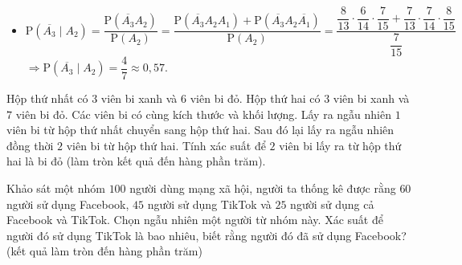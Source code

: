 \begin{bt}
{\begin{itemize}
\begin{eqnarray*}
				 &=&\dfrac{7}{13}\cdot \dfrac{7}{14}\cdot \dfrac{8}{15}.
			\end{eqnarray*}
			\item  $\mathrm{P}\left(\overline{A_3}\mid A_2\right)=\dfrac{\mathrm{P}\left(\overline{A_3}A_2\right)}{\mathrm{P}\left(A_2\right)}=\dfrac{\mathrm{P}\left(\overline{A_3}A_2A_1\right)+\mathrm{P}\left(\overline{A_3}A_2\overline{A_1}\right)}{\mathrm{P}\left(A_2\right)}=\dfrac{\dfrac{8}{13}\cdot \dfrac{6}{14}\cdot \dfrac{7}{15}+\dfrac{7}{13}\cdot \dfrac{7}{14}\cdot \dfrac{8}{15}}{\dfrac{7}{15}}$\\
			$\Rightarrow \mathrm{P}\left(\overline{A_3}\mid  A_2\right)=\dfrac{4}{7}\approx 0{,}57$.
		\end{itemize}
	 }
\end{bt}

\begin{bt}%
	Hộp thứ nhất có $3$ viên bi xanh và $6$ viên bi đỏ. Hộp thứ hai có $3$ viên bi xanh và $7$ viên bi đỏ. Các viên bi có cùng kích thước và khối lượng. Lấy ra ngẫu nhiên $1$ viên bi từ hộp thứ nhất chuyển sang hộp thứ hai. Sau đó lại lấy ra ngẫu nhiên đồng thời $2$ viên bi từ hộp thứ hai. Tính xác suất để $2$ viên  bi lấy ra từ hộp thứ hai là bi đỏ (làm tròn kết quả đến hàng phần trăm).
\end{bt}

\begin{bt}%
	Khảo sát một nhóm $100$ người dùng mạng xã hội, người ta thống kê được rằng $60$ người sử dụng Facebook, $45$ người sử dụng TikTok và $25$ người sử dụng cả Facebook và TikTok. Chọn ngẫu nhiên một người từ nhóm này. Xác  suất để người đó sử dụng TikTok là bao nhiêu, biết rằng người đó đã sử dụng Facebook? (kết quả làm tròn đến hàng phần trăm)
\end{bt}

